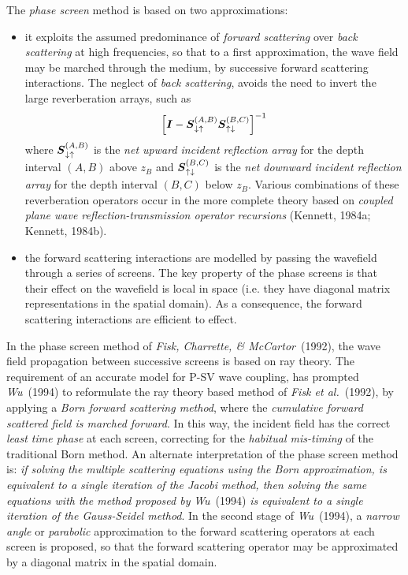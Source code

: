 The {\em phase screen\/} method is based on two approximations:
\begin{itemize}
\item it exploits the assumed predominance of {\em forward scattering\/} over 
{\em back scattering \/} at high frequencies, so that to a first 
approximation, the wave field may 
be marched through the medium, by successive forward scattering 
interactions. The neglect of {\em back scattering\/}, avoids the need to 
invert the large reverberation arrays, such as 
\[
{\left[{\mbox{\boldmath$\mit I$\unboldmath}}-{\mbox{\boldmath$\mit S$\unboldmath}}_{\downarrow \uparrow }^{(A,B)}{\mbox{\boldmath$\mit S$\unboldmath}}_{\uparrow 
\downarrow }^{(B,C)}\right]}^{-1}
\] 
where ${\mbox{\boldmath$\mit S$\unboldmath}}_{\downarrow \uparrow }^{(A,B)}$ is the {\em net upward 
incident reflection array\/} for the depth interval $(A,B)$ above $z_B$ and ${\mbox{\boldmath$\mit S$\unboldmath}}_{\uparrow 
\downarrow }^{(B,C)}$ is the {\em net downward incident
reflection array\/} for the depth interval $(B,C)$ below $z_B$. Various combinations 
of these reverberation operators occur in the more complete theory based
on {\em coupled plane wave reflection-transmission operator recursions\/} 
(Kennett, 1984a; Kennett, 1984b).
\item the forward scattering interactions are modelled by passing the 
wavefield through a series of screens. The key property of the phase screens 
is that their effect on the wavefield is local in space (i.e. they have 
diagonal matrix representations in the spatial domain). As a consequence, 
the forward scattering interactions are  efficient to effect.
\end{itemize} 

In the phase screen method of {\em Fisk, Charrette, \& McCartor\/}~(1992),
the wave field  propagation between successive screens is based on ray theory.
The requirement of an  accurate model for P-SV wave coupling, has prompted 
{\em Wu\/}~(1994) to reformulate the ray theory based method of {\em Fisk 
et al.\/}~(1992), by applying a {\em  Born forward scattering method\/},
where the {\em cumulative forward scattered field is marched forward}. 
In this way, the incident field has the correct {\em least time phase\/} 
at each screen, 
correcting for the {\em habitual mis-timing\/} of the traditional Born method.
An alternate interpretation of the phase screen method  is: {\em if solving the multiple scattering equations using the Born approximation, 
is equivalent to a single iteration of the Jacobi method, then 
solving the same equations with the method proposed by\/} {\em 
Wu\/}~(1994) {\em
is equivalent to a single iteration of the  Gauss-Seidel method\/}. 
In the second stage of {\em Wu\/}~(1994),  
a {\em narrow angle\/} or {\em parabolic\/} approximation  to the 
forward scattering operators at each screen is proposed, so that the 
forward scattering operator may be approximated by a diagonal matrix in the spatial domain. 

